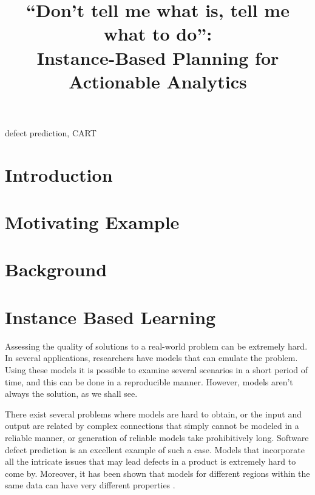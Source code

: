 \documentclass[conference]{IEEEtran}
\begin{document}
  \title{``Don't tell me what is, tell me what to do'':\\Instance-Based Planning for Actionable Analytics}
  
  \author{
    \and
   }
  
  
  \maketitle
  
  
  \begin{abstract}
 
  \end{abstract}
  \begin{IEEEkeywords}
    defect prediction, CART
  \end{IEEEkeywords}
  
\section{Introduction}
\section{Motivating Example}
\section{Background}
\section{Instance Based Learning}

Assessing the quality of solutions to a real-world problem can be extremely hard. In several applications, researchers have models that can emulate the problem. Using these models it is possible to examine several scenarios in a short period of time, and this can be done in a reproducible manner. However, models aren't always the solution, as we shall see. 

There exist several problems where models are hard to obtain, or the input and output are related by complex connections that simply cannot be modeled in a reliable manner, or generation of reliable models take prohibitively long. Software defect prediction is an excellent example of such a case. Models that incorporate all the intricate issues that may lead defects in a product is extremely hard to come by. Moreover, it has been shown that models for different regions within the same data can have very different properties \cite{localvsglobal}. 
\end{document}
